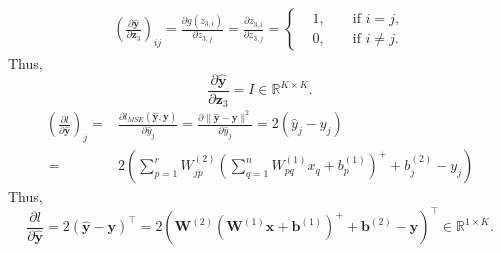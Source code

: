 \documentclass[10pt,a4paper]{article}
\theoremstyle{dotlessP}
\def\RR{\mathbb{R}}
\newcommand{\dldy}{\frac{\partial l}{\partial \bm{\hat{y}}}}
\newcommand{\dydz}{\frac{\partial \bm{\hat{y}}}{\partial \bm z_3}}
\newcommand{\yh}{\bm{\hat{y}}}
\begin{document}
\begin{enumerate}[(a)]
\begin{equation}
\begin{aligned}
\left(\dydz\right)_{ij}= \frac{\partial g( z_{3,i} ) }{\partial  z_{3,j}} = \frac{\partial  z_{3,i}  }{\partial z_{3,j}}
=\left\lbrace 
\begin{aligned}
&1, & &\text{ if } i=j,\\
& 0, &  &\text{ if } i\neq j.
\end{aligned}
\right. 
\end{aligned}
\end{equation}
Thus,
\begin{equation}
\dydz = I \in \RR^{K\times K}.
\end{equation}
\begin{equation}
\begin{aligned}
\left(\dldy\right)_j = &\frac{\partial l_{MSE}(\yh,\bm y)}{\partial \hat{y}_j}= \frac{\partial \|\yh-\bm y\|^2}{\partial \hat{y}_j} = 2(\hat{y}_j - y_j)\\\
=& 2\left(\sum_{p=1}^{r}W^{(2)}_{jp} \left( \sum_{q=1}^nW^{(1)}_{pq}x_q+b^{(1)}_p\right)^++b^{(2)}_j- y_j\right) 
\end{aligned}
\end{equation}
Thus, 
\begin{equation}
\dldy = 2(\yh -\bm y)^\top =2 \left(\bm W^{(2)}\left(\bm W^{(1)} \bm x+\bm b^{(1)}\right)^+ + \bm b^{(2)}-\bm y\right)^\top\in \RR^{1\times K}.
\end{equation}
\end{enumerate}
\newpage
\end{document}
